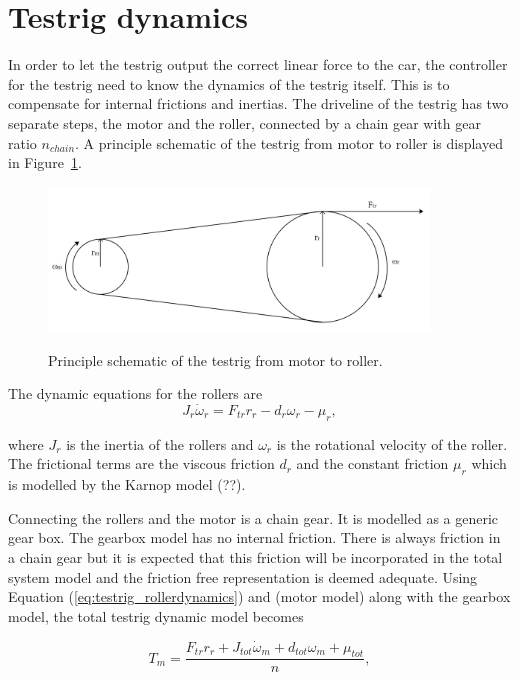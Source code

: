 \section{Testrig dynamics}\label{sec:rigdynamics}
In order to let the testrig output the correct linear force to the car, the
controller for the testrig need to know the dynamics of the testrig itself. This
is to compensate for internal frictions and inertias. The driveline of the
testrig has two separate steps, the motor and the roller, connected by a chain
gear with gear ratio $n_{chain}$. A principle schematic of the testrig from
motor to roller is displayed in Figure~\ref{fig:testrig_testrigdynamics}.
\begin{figure}[H]
    \centering\label{fig:testrig_testrigdynamics}
    \includegraphics[width=0.9\textwidth]{./img/testrig_rollerschematic.png}
    \caption{Principle schematic of the testrig from motor to roller.}
\end{figure}
The dynamic equations for the rollers are
\begin{equation} \label{eq:testrig_rollerdynamics}
    J_r \dot{\omega}_r = F_{tr}r_r - d_r \omega_r - \mu_r,
\end{equation}

where $J_r$ is the inertia of the rollers and $\omega_r$ is the rotational velocity
of the roller. The frictional terms are the viscous friction $d_r$ and the
constant friction $\mu_r$ which is modelled by the Karnop model (??).

Connecting the rollers and the motor is a chain gear. It is modelled as a
generic gear box. The gearbox model has no internal friction. There is always friction in a
chain gear but it is expected that this friction will be incorporated in the
total system model and the friction free representation is deemed adequate.
Using Equation (\ref{eq:testrig_rollerdynamics}) and (motor model) along with
the gearbox model, the total testrig dynamic model becomes

\begin{equation} \label{eq:testrig_totaldynamics} 
    T_m = \frac{F_{tr} r_r + J_{tot} \dot{\omega}_m + d_{tot} \omega_m + \mu_{tot}}{n},
\end{equation}

